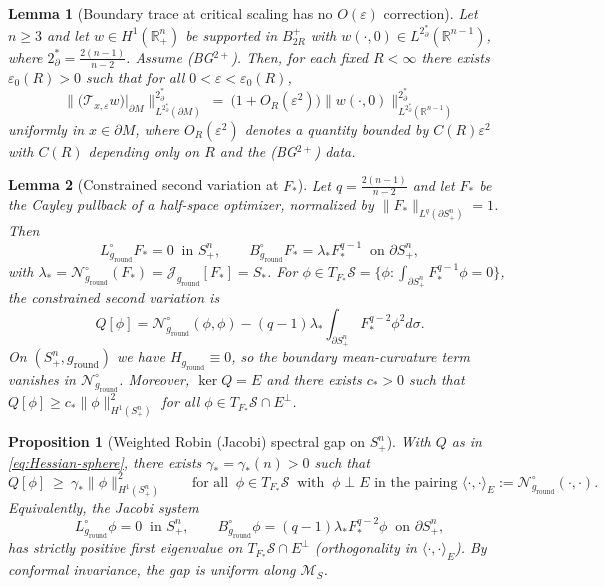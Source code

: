 \documentclass[10pt,a4paper]{amsart}
\newtheorem{lemma}{Lemma}
\newtheorem{proposition}{Proposition}
\newcommand{\R}{\mathbb{R}}
\begin{document}
\begin{lemma}[Boundary trace at critical scaling has no $O(\varepsilon)$ correction]\label{lem:trace-no-linear}
Let $n\ge 3$ and let $w\in H^1(\R^n_+)$ be supported in $B_{2R}^+$ with
$w(\cdot,0)\in L^{2^*_{\partial}}(\R^{n-1})$, where $2^*_{\partial}=\frac{2(n-1)}{n-2}$.
Assume \textup{(BG$^{2+}$)}. Then, for each fixed $R<\infty$ there exists
$\varepsilon_0(R)>0$ such that for all $0<\varepsilon<\varepsilon_0(R)$,
\[
\big\|\big(\mathcal T_{x,\varepsilon}w\big)\big|_{\partial M}\big\|_{L^{2^*_{\partial}}(\partial M)}^{2^*_{\partial}}
\ =\ \big(1+O_R(\varepsilon^2)\big)\|w(\cdot,0)\|_{L^{2^*_{\partial}}(\R^{n-1})}^{2^*_{\partial}}
\]
uniformly in $x\in\partial M$, where $O_R(\varepsilon^2)$ denotes a quantity bounded by
$C(R)\varepsilon^2$ with $C(R)$ depending only on $R$ and the \textup{(BG$^{2+}$)} data.
\end{lemma}

\begin{lemma}[Constrained second variation at $F_\ast$]\label{lem:hessian-sphere}
Let $q=\frac{2(n-1)}{n-2}$ and let $F_\ast$ be the Cayley pullback of a half-space optimizer, normalized by $\|F_\ast\|_{L^q(\partial S^n_+)}=1$. Then
\[
L_{g_{\mathrm{round}}}^\circ F_\ast=0\ \text{ in }S^n_+,
\qquad
B_{g_{\mathrm{round}}}^\circ F_\ast=\lambda_\ast F_\ast^{q-1}\ \text{ on }\partial S^n_+,
\]
with $\lambda_\ast=\mathcal N^\circ_{g_{\mathrm{round}}}(F_\ast)=\mathcal J_{g_{\mathrm{round}}}[F_\ast]=S_\ast$. For $\phi\in T_{F_\ast}\mathcal S=\{\phi:\int_{\partial S^n_+}F_\ast^{q-1}\phi=0\}$, the constrained second variation is
\begin{equation}\label{eq:Hessian-sphere}
Q[\phi]
= \mathcal N^\circ_{g_{\mathrm{round}}}(\phi,\phi)-(q-1)\lambda_\ast\int_{\partial S^n_+} F_\ast^{q-2}\phi^2d\sigma.
\end{equation}
On $(S^n_+,g_{\mathrm{round}})$ we have $H_{g_{\mathrm{round}}}\equiv0$, so the boundary mean-curvature term vanishes in $\mathcal N^\circ_{g_{\mathrm{round}}}$. Moreover, $\ker Q=E$ and there exists $c_\ast>0$ such that $Q[\phi]\ge c_\ast\|\phi\|_{H^1(S^n_+)}^2$ for all $\phi\in T_{F_\ast}\mathcal S\cap E^\perp$.
\end{lemma}

\begin{proposition}[Weighted Robin (Jacobi) spectral gap on $S^n_+$]\label{prop:robin-gap}
With $Q$ as in \eqref{eq:Hessian-sphere}, there exists $\gamma_\ast=\gamma_\ast(n)>0$ such that
\[
  Q[\phi]\ \ge\ \gamma_\ast\|\phi\|_{H^1(S^n_+)}^{2}
  \qquad\text{for all }\ \phi\in T_{F_\ast}\mathcal S\ \text{ with }\ \phi\perp E
  \text{ in the pairing } \langle\cdot,\cdot\rangle_{E}:=\mathcal N^\circ_{g_{\mathrm{round}}}(\cdot,\cdot).
\]
Equivalently, the Jacobi system
\[
  L_{g_{\mathrm{round}}}^\circ\phi=0\ \text{ in } S^n_+,
  \qquad
  B_{g_{\mathrm{round}}}^\circ\phi=(q-1)\lambda_\ast F_\ast^{q-2}\phi\ \text{ on } \partial S^n_+,
\]
has strictly positive first eigenvalue on $T_{F_\ast}\mathcal S\cap E^\perp$ (orthogonality in $\langle\cdot,\cdot\rangle_{E}$). By conformal invariance, the gap is uniform along $\mathcal M_S$.
\end{proposition}
\end{document}
